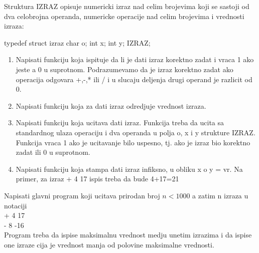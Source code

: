 \begin{Exercise}[label=v2.5_05] 
   Struktura IZRAZ opisuje numericki izraz nad celim brojevima koji se sastoji
   od dva celobrojna operanda, numericke operacije nad celim brojevima i
   vrednosti izraza:
   
   typedef struct izraz
   {
	char o;
	int x;
	int y;
   } IZRAZ;

\begin{enumerate}

   \item Napisati funkciju koja ispituje da li je dati izraz korektno 
   zadat i vraca 1 ako jeste a 0 u suprotnom. Podrazumevamo da je 
   izraz korektno zadat ako operacija odgovara +,-,* ili / i u slucaju
   deljenja drugi operand je razlicit od 0.
   
   \item Napisati funkciju koja za dati izraz odredjuje vrednost izraza. 
   
   \item Napisati funkciju koja ucitava dati izraz. Funkcija
   treba da ucita sa standardnog ulaza operaciju i dva
   operanda u polja o, x i y strukture IZRAZ. Funkcija vraca
   1 ako je ucitavanje bilo uspesno, tj. ako je izraz bio
   korektno zadat ili 0 u suprotnom. 
   
   \item Napisati funkciju koja stampa dati izraz infiksno, u obliku
   x o y = vr. Na primer, za izraz + 4 17 ispis treba 
   da bude 4+17=21
   
  
\end{enumerate}
Napisati glavni program koji ucitava prirodan broj $n<1000$ a zatim n izraza
   u notaciji \\
   + 4 17 \\
   - 8 -16 \\
   Program treba da ispise maksimalnu vrednost medju unetim izrazima i da ispise one
   izraze cija je vrednost manja od polovine maksimalne vrednosti.
   	
\end{Exercise}
\begin{Answer}[ref=v2.5_05]
\end{Answer}



